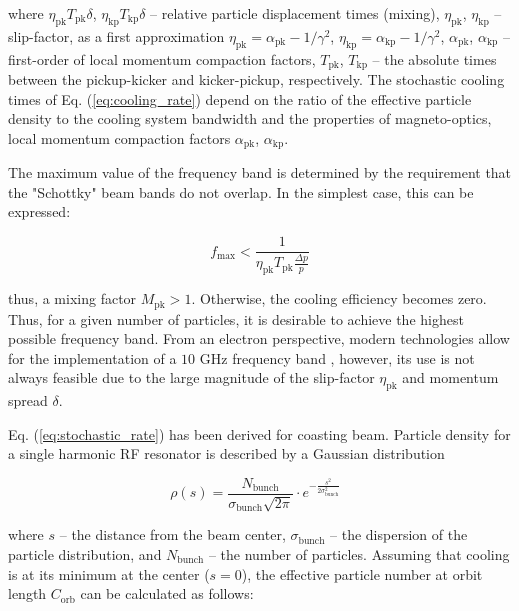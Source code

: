 \documentclass[submitting]{nst}
\begin{document}
\noindent where $\eta_{\text{pk}}T_{\text{pk}}\delta$, $\eta_{\text{kp}}T_{\text{kp}}\delta$ -- relative particle displacement times (mixing),  $\eta_{\text{pk}}$, $\eta_{\text{kp}}$ -- slip-factor, as a first approximation $\eta_{\text{pk}}=\alpha_{\text{pk}}-1/\gamma^2$, $\eta_{\text{kp}}=\alpha_{\text{kp}}-1/\gamma^2$, $\alpha_{\text{pk}}$, $\alpha_{\text{kp}}$ -- first-order of local momentum compaction factors, $T_{\text{pk}}$, $T_{\text{kp}}$ -- the absolute times between the pickup-kicker and kicker-pickup, respectively. The stochastic cooling times of Eq. (\ref{eq:cooling_rate}) depend on the ratio of the effective particle density to the cooling system bandwidth and the properties of magneto-optics, local momentum compaction factors $\alpha_{\text{pk}}$, $\alpha_{\text{kp}}$.

\par The maximum value of the frequency band is determined by the requirement that the "Schottky" beam bands do not overlap. In the simplest case, this can be expressed:

\begin{equation}
f_{\textrm{max}}<\frac{1}{\eta_{\textrm{pk}}T_{\textrm{pk}}\frac{\Delta p}{p}}
\end{equation}

\noindent thus, a mixing factor $M_{\text{pk}}>1$. Otherwise, the cooling efficiency becomes zero. Thus, for a given number of particles, it is desirable to achieve the highest possible frequency band. From an electron perspective, modern technologies allow for the implementation of a $10$ GHz frequency band \cite{b7}, however, its use is not always feasible due to the large magnitude of the slip-factor $\eta_{\text{pk}}$ and momentum spread $\delta$.

\par Eq. (\ref{eq:stochastic_rate}) has been derived for coasting beam. Particle density for a single harmonic RF resonator is described by a Gaussian distribution

\begin{equation}
\rho(s)=\frac{N_{\textrm{bunch}}}{\sigma_{\textrm{bunch}}\sqrt{2\pi}}\cdot e^{-\frac{s^2}{2\sigma_{\textrm{bunch}}^2}}\ \ \ 
\end{equation}	

\noindent where $s$ – the distance from the beam center, $\sigma_{\text{bunch}}$ – the dispersion of the particle distribution, and $N_{\text{bunch}}$ – the number of particles. Assuming that cooling is at its minimum at the center ($s=0$), the effective particle number at orbit length $C_{\text{orb}}$ can be calculated as follows:
\end{document}
